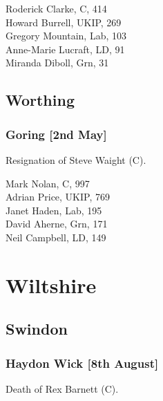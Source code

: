 \documentclass[a4paper,openany,10pt]{book}
\begin{document}
Roderick Clarke, C, 414\\
Howard Burrell, UKIP, 269\\
Gregory Mountain, Lab, 103\\
Anne-Marie Lucraft, LD, 91\\
Miranda Diboll, Grn, 31\\


\subsection*{Worthing}

\subsubsection*{Goring \hspace*{\fill}\nolinebreak[1]%
\enspace\hspace*{\fill}
[2nd May]}


Resignation of Steve Waight (C).



Mark Nolan, C, 997\\
Adrian Price, UKIP, 769\\
Janet Haden, Lab, 195\\
David Aherne, Grn, 171\\
Neil Campbell, LD, 149\\


\section{Wiltshire}

\subsection*{Swindon}

\subsubsection*{Haydon Wick \hspace*{\fill}\nolinebreak[1]%
\enspace\hspace*{\fill}
[8th August]}


Death of Rex Barnett (C).
\end{document}
